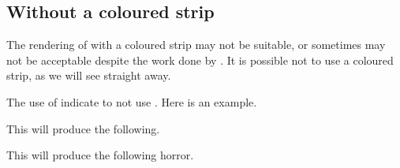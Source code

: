 \documentclass{tutodoc}
\begin{document}
\subsection{Without a coloured strip}

The rendering of  with a coloured strip may not be suitable, or sometimes may not be acceptable despite the work done by .
It is possible not to use a coloured strip, as we will see straight away.


\begin{tdocexa}
    The use of  indicate to not use .
    Here is an example.


    This will produce the following.

    \medskip

    
\end{tdocexa}




\begin{tdocexa}
    \leavevmode


    This will produce the following horror.

    \medskip

    
\end{tdocexa}
\end{document}
